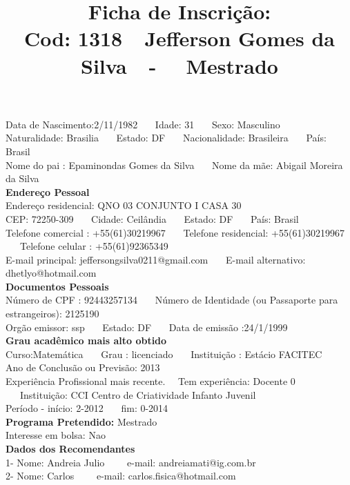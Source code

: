 \documentclass[11pt]{article}
\title{\vspace*{-4cm} Ficha de Inscrição: \\Cod: 1318\ \ Jefferson Gomes da Silva\ \ - \ \ Mestrado 
 }
\date{}
\begin{document}
\maketitle
\vspace*{-1.5cm}
\noindent Data de Nascimento:2/11/1982
\ \ \ Idade: 31   \ \ \ Sexo: Masculino
\\
Naturalidade: Brasilia   
\ \ \  Estado: DF
\ \ \  Nacionalidade: Brasileira
\ \ \ País: Brasil
\\        
Nome do pai : Epaminondas Gomes da Silva
\ \ \ Nome da mãe: Abigail Moreira da Silva          
\\[0.2cm]                     
\textbf{Endereço Pessoal} 
\\ 
\noindent Endereço residencial: QNO 03 CONJUNTO I CASA 30
\\
        CEP: 72250-309 
\ \ \ Cidade: Ceilândia 
\ \ \ Estado: DF 
\ \ \ País: Brasil
\\		
		Telefone comercial : +55(61)30219967
\ \ \ Telefone residencial: +55(61)30219967
\ \ \ Telefone celular : +55(61)92365349
\\
E-mail principal: jeffersongsilva0211@gmail.com
\ \ \ E-mail alternativo: dhetlyo@hotmail.com 
\\[0.2cm] 
\textbf{Documentos Pessoais}
\\
\noindent Número de CPF : 92443257134
\ \ \ Número de Identidade (ou Passaporte para estrangeiros): 2125190
\\
Orgão emissor: ssp
\ \ \ Estado: DF
\ \ \ Data de emissão :24/1/1999
\\[0.3cm]
\textbf{Grau acadêmico mais alto obtido}
\\	
Curso:Matemática
\ \ \ Grau : licenciado
\ \ \ Instituição : Estácio  FACITEC
\\			
Ano de Conclusão ou Previsão: 2013
\\ 
Experiência Profissional mais recente. \ \  
Tem experiência: Docente 0  
\ \ \ Instituição: CCI Centro de Criatividade Infanto Juvenil
\\  
Período - início: 2-2012
\ \ \ fim: 0-2014
\\[0.2cm] 
\textbf{Programa Pretendido:} Mestrado\\
Interesse em bolsa: Nao
\\[0.3cm]		
\textbf{Dados dos Recomendantes} 
\\
1- Nome: Andreia Julio
\ \ \ \  e-mail: andreiamati@ig.com.br 
\\
2- Nome: Carlos
\ \ \ \ e-mail: carlos.fisica@hotmail.com
\\
\end{document}
